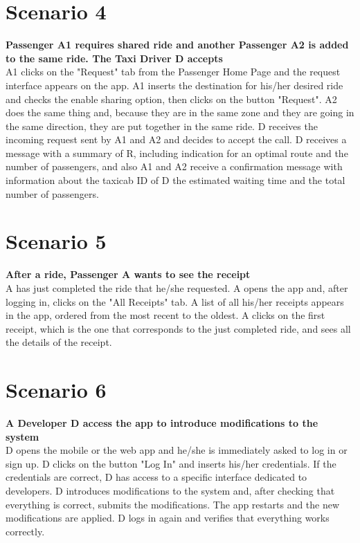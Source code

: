 \section{Scenario 4}
\textbf{Passenger A1 requires shared ride and another Passenger A2 is added to the same ride. The Taxi Driver D accepts} \\
A1 clicks on the "Request" tab from the Passenger Home Page and the request interface appears on the app. A1 inserts the destination for his/her desired ride and checks the enable sharing option, then clicks on the button "Request". A2 does the same thing and, because they are in the same zone and they are going in the same direction, they are put together in the same ride. D receives the incoming request sent by A1 and A2 and decides to accept the call. D receives a message with a summary of R, including indication for an optimal route and the number of passengers, and also A1 and A2 receive a confirmation message with information about the taxicab ID of D the estimated waiting time and the total number of passengers.

\section{Scenario 5}
\textbf{After a ride, Passenger A wants to see the receipt} \\
A has just completed the ride that he/she requested. A opens the app and, after logging in, clicks on the "All Receipts" tab. A list of all his/her receipts appears in the app, ordered from the most recent to the oldest. A clicks on the first receipt, which is the one that corresponds to the just completed ride, and sees all the details of the receipt.

\section{Scenario 6}
\textbf{A Developer D access the app to introduce modifications to the system} \\
D opens the mobile or the web app and he/she is immediately asked to log in or sign up. D clicks on the button "Log In" and inserts his/her credentials. If the credentials are correct, D has access to a specific interface dedicated to developers. D introduces modifications to the system and, after checking that everything is correct, submits the modifications. The app restarts and the new modifications are applied. D logs in again and verifies that everything works correctly.
